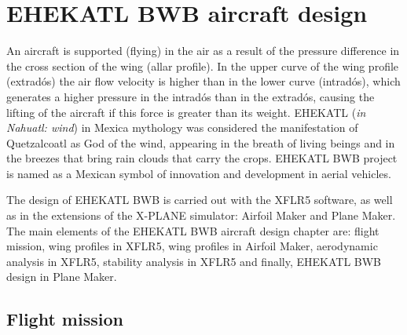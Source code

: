 


\chapter{EHEKATL BWB aircraft design}

An aircraft is supported (flying) in the air as a result of the pressure difference in the cross section of the wing (allar profile). In the upper curve of the wing profile (extradós) the air flow velocity is higher than in the lower curve (intradós), which generates a higher pressure in the intradós than in the extradós, causing the lifting of the aircraft if this force is greater than its weight.
%
EHEKATL (\textit{in Nahuatl: wind}) in Mexica mythology was considered the manifestation of Quetzalcoatl as God of the wind, appearing in the breath of living beings and in the breezes that bring rain clouds that carry the crops. EHEKATL BWB project is named as a Mexican symbol of innovation and development in aerial vehicles.

The design of EHEKATL BWB is carried out with the XFLR5 software, as well as in the extensions of the X-PLANE simulator: Airfoil Maker and Plane Maker. The main elements of the EHEKATL BWB aircraft design chapter are: flight mission, wing profiles in XFLR5, wing profiles in Airfoil Maker, aerodynamic analysis in XFLR5, stability analysis in XFLR5 and finally, EHEKATL BWB design in Plane Maker.  

\section{Flight mission}

